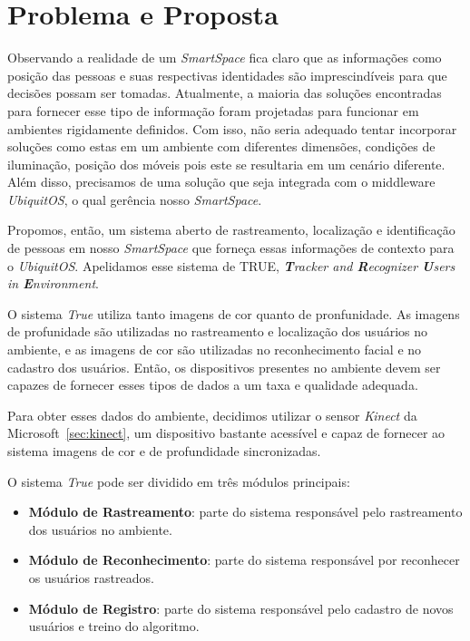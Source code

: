 \chapter{Problema e Proposta}

Observando a realidade de um \textit{SmartSpace} fica claro que as informações como posição das pessoas e suas respectivas identidades são imprescindíveis para que decisões possam ser tomadas. Atualmente, a maioria das soluções encontradas para fornecer esse tipo de informação foram projetadas para funcionar em ambientes rigidamente definidos. Com isso, não seria adequado tentar incorporar soluções como estas em um ambiente com diferentes dimensões, condições de iluminação, posição dos móveis pois este se resultaria em um cenário diferente. Além disso, precisamos de uma solução que seja integrada com o middleware \textit{UbiquitOS}, o qual gerência nosso \textit{SmartSpace}.

Propomos, então, um sistema aberto de rastreamento, localização e identificação de pessoas em nosso \textit{SmartSpace} que forneça essas informações de contexto para o \textit{UbiquitOS}. Apelidamos esse sistema de TRUE, \textit{\textbf{T}racker and \textbf{R}ecognizer \textbf{U}sers in \textbf{E}nvironment}.

O sistema \textit{True} utiliza tanto imagens de cor quanto de pronfunidade. As imagens de profunidade são utilizadas no rastreamento e localização dos usuários no ambiente, e as imagens de cor são utilizadas no reconhecimento facial e no cadastro dos usuários. Então, os dispositivos presentes no ambiente devem ser capazes de fornecer esses tipos de dados a um taxa e qualidade adequada. 

Para obter esses dados do ambiente, decidimos utilizar o sensor \textit{Kinect} da Microsoft~\ref{sec:kinect}, um dispositivo bastante acessível e capaz de fornecer ao sistema imagens de cor e de profundidade sincronizadas.

O sistema \textit{True} pode ser dividido em três módulos principais:

	\begin{itemize}
		\item \textbf{Módulo de Rastreamento}: parte do sistema responsável pelo rastreamento dos usuários no ambiente.
		\item \textbf{Módulo de Reconhecimento}: parte do sistema responsável por reconhecer os usuários rastreados.
		\item \textbf{Módulo de Registro}: parte do sistema responsável pelo cadastro de novos usuários e treino do algoritmo.
	\end{itemize}

